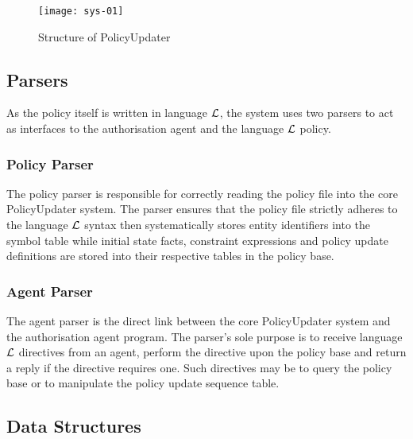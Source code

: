 \documentclass[11pt]{report}
\begin{document}
      \begin{figure}[tbhp]
        \begin{center}
          \texttt{[image: sys-01]}
          \caption{Structure of PolicyUpdater}
          \label{figu-polup-sysst}
        \end{center}
      \end{figure}

      \subsection{Parsers}
        \label{subs-polup-parse}

        As the policy itself is written in language ${\cal L}$, the system uses
        two parsers to act as interfaces to the authorisation agent and
        the language ${\cal L}$ policy.

        \subsubsection{Policy Parser}

          The policy parser is responsible for correctly reading the policy
          file into the core PolicyUpdater system. The parser ensures that
          the policy file strictly adheres to the language $\cal{L}$ syntax
          then systematically stores entity identifiers into the symbol table
          while initial state facts, constraint expressions and policy update
          definitions are stored into their respective tables in the policy
          base.

        \subsubsection{Agent Parser}

           The agent parser is the direct link between the core PolicyUpdater
          system and the authorisation agent program. The parser's sole purpose
          is to receive language $\cal{L}$ directives from an agent, perform
          the directive upon the policy base and return a reply if the
          directive requires one. Such directives may be to query the policy
          base or to manipulate the policy update sequence table.

      \subsection{Data Structures}
        \label{subs-polup-dstru}
\end{document}
